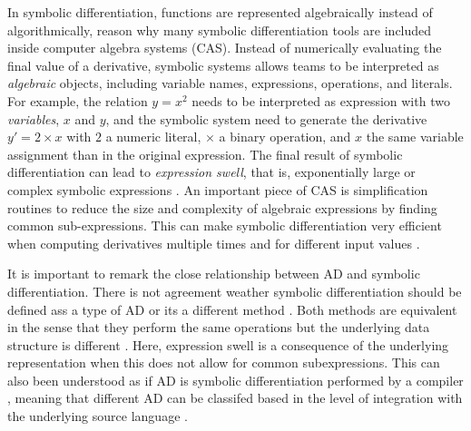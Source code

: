 In symbolic differentiation, functions are represented algebraically instead of algorithmically, reason why many symbolic differentiation tools are included inside computer algebra systems (CAS)\cite{Symbolics_jl_2022}. 
Instead of numerically evaluating the final value of a derivative, symbolic systems allows teams to be interpreted as \textit{algebraic} objects, including variable names, expressions, operations, and literals. 
For example, the relation $y = x^2$ needs to be interpreted as expression with two \textit{variables}, $x$ and $y$, and the symbolic system need to generate the derivative $y' = 2 \times x$ with $2$ a numeric literal, $\times$ a binary operation, and $x$ the same variable assignment than in the original expression.
The final result of symbolic differentiation can lead to \textit{expression swell}, that is, exponentially large or complex symbolic expressions \cite{Baydin_Pearlmutter_Radul_Siskind_2015}.
An important piece of CAS is simplification routines to reduce the size and complexity of algebraic expressions by finding common sub-expressions.  
This can make symbolic differentiation very efficient when computing derivatives multiple times and for different input values \cite{Dürrbaum_Klier_Hahn_2002}. 

It is important to remark the close relationship between AD and symbolic differentiation.
There is not agreement weather symbolic differentiation should be defined ass a type of AD\cite{juedes1991taxonomy, Elliott_2018, Laue2020}  or its a different method \cite{Baydin_Pearlmutter_Radul_Siskind_2015}.  
Both methods are equivalent in the sense that they perform the same operations but the underlying data structure is different \cite{Laue2020}. 
Here, expression swell is a consequence of the underlying representation when this does not allow for common subexpressions. 
This can also been understood as if AD is symbolic differentiation performed by a compiler \cite{Elliott_2018}, meaning that different AD can be classifed based in the level of integration with the underlying source language \cite{juedes1991taxonomy}.

